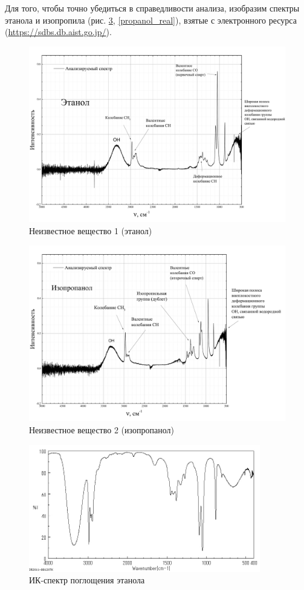 Для того, чтобы точно убедиться в справедливости анализа, изобразим спектры этанола и изопропила (рис. \ref{ethanol_real}, \ref{propanol_real}), взятые с электронного ресурса (\href{https://sdbs.db.aist.go.jp/}{https://sdbs.db.aist.go.jp/}).
\begin{figure}[H]
	\centering
	\includegraphics[angle = 90, height=0.83\textheight]{data/ethanol}
	\caption{Неизвестное вещество 1 (этанол)}
	\label{ethanol}
\end{figure}
\begin{figure}[h!]
	\centering
	\includegraphics[angle = 90, height=0.95\textheight]{data/isopropanol}
	\caption{Неизвестное вещество 2 (изопропанол)}
	\label{isopropanol}
\end{figure}
\begin{figure}[h!]
	\centering
	\includegraphics[width=0.9\textwidth]{data/ethanol_real}
	\caption{ИК-спектр поглощения этанола}
	\label{ethanol_real}
\end{figure}
